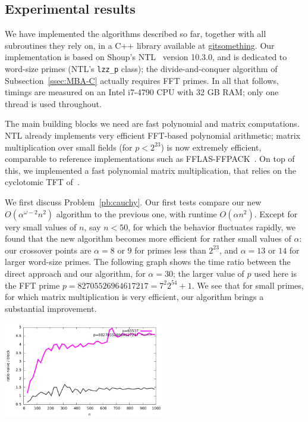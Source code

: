 \documentclass{sig-alternate}
\begin{document}

\subsection{Experimental results}

We have implemented the algorithms described so far, together with all
subroutines they rely on, in a C++ library available at
\url{gitsomething}. Our implementation is based on Shoup's
NTL~\cite{Shoup95,NTL} version 10.3.0, and is dedicated to word-size
primes (NTL's \texttt{lzz\_p} class); the divide-and-conquer algorithm
of Subsection~\ref{ssec:MBA-C} actually requires FFT primes.  In all
that follows, timings are measured on an Intel i7-4790 CPU with 32 GB
RAM; only one thread is used throughout.

The main building blocks we need are fast polynomial and matrix
computations. NTL already implements very efficient FFT-based
polynomial arithmetic; matrix multiplication over small fields (for $p
< 2^{23}$) is now extremely efficient, comparable to reference
implementations such as FFLAS-FFPACK~\cite{fflas-ffpack}. On top of
this, we implemented a fast polynomial matrix multiplication, that
relies on the cyclotomic TFT of~\cite{ArSc15}.

We first discuss Problem~\ref{pb:cauchy}. Our first tests compare our
new $O(\alpha^{\omega-2} n^2)$ algorithm to the previous one, with
runtime $O(\alpha n^2)$. Except for very small values of $n$, say $n <
50$, for which the behavior fluctuates rapidly, we found that the new
algorithm becomes more efficient for rather small values of $\alpha$:
our crossover points are $\alpha=8$ or $9$ for primes less than
$2^{23}$, and $\alpha=13$ or $14$ for larger word-size primes. The
following graph shows the time ratio between the direct approach and
our algorithm, for $\alpha=30$; the larger value of $p$ used here is
the FFT prime $p=82705526964617217=7^2 2^{54}+1$. We see that for
small primes, for which matrix multiplication is very efficient, our
algorithm brings a substantial improvement.

\includegraphics[width=7cm]{ratio-block-eschost-desktop.pdf}
\end{document}
